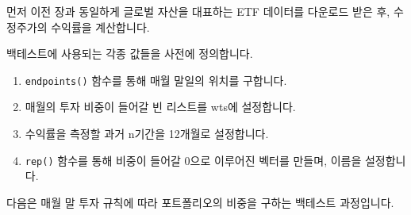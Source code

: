 \documentclass[12pt,]{book}
\newenvironment{Shaded}{\begin{snugshade}}{\end{snugshade}}
\newcommand{\ControlFlowTok}[1]{\textcolor[rgb]{0.13,0.29,0.53}{\textbf{#1}}}
\newcommand{\DataTypeTok}[1]{\textcolor[rgb]{0.13,0.29,0.53}{#1}}
\newcommand{\DecValTok}[1]{\textcolor[rgb]{0.00,0.00,0.81}{#1}}
\newcommand{\KeywordTok}[1]{\textcolor[rgb]{0.13,0.29,0.53}{\textbf{#1}}}
\newcommand{\NormalTok}[1]{#1}
\newcommand{\OperatorTok}[1]{\textcolor[rgb]{0.81,0.36,0.00}{\textbf{#1}}}
\newcommand{\StringTok}[1]{\textcolor[rgb]{0.31,0.60,0.02}{#1}}
\providecommand{\tightlist}{%
  \setlength{\itemsep}{0pt}\setlength{\parskip}{0pt}}
\begin{document}
\begin{Shaded}
\end{Shaded}

먼저 이전 장과 동일하게 글로벌 자산을 대표하는 ETF 데이터를 다운로드 받은 후, 수정주가의 수익률을 계산합니다.

\begin{Shaded}
\end{Shaded}

백테스트에 사용되는 각종 값들을 사전에 정의합니다.

\begin{enumerate}
\def\labelenumi{\arabic{enumi}.}
\tightlist
\item
  \texttt{endpoints()} 함수를 통해 매월 말일의 위치를 구합니다.
\item
  매월의 투자 비중이 들어갈 빈 리스트를 wts에 설정합니다.
\item
  수익률을 측정할 과거 n기간을 12개월로 설정합니다.
\item
  \texttt{rep()} 함수를 통해 비중이 들어갈 0으로 이루어진 벡터를 만들며, 이름을 설정합니다.
\end{enumerate}

다음은 매월 말 투자 규칙에 따라 포트폴리오의 비중을 구하는 백테스트 과정입니다.
\end{document}
